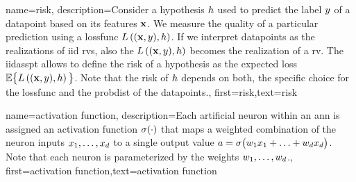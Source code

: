{name={risk},
	description={Consider a \gls{hypothesis} $h$ used to predict the \gls{label} 
		$y$ of a \gls{datapoint} based on its \gls{feature}s ${\bf x}$. We measure 
		the quality of a particular \gls{prediction} using a \gls{lossfunc} $L\left(({\bf x},y),h \right)$. 
		If we interpret \gls{datapoint}s as the \gls{realization}s of \gls{iid} \gls{rv}s, 
		also the $L\left(({\bf x},y),h \right)$ becomes the \gls{realization} 
		of a \gls{rv}. The \gls{iidasspt} allows to define the risk of a \gls{hypothesis} 
		as the expected \gls{loss} $\mathbb{E} \big\{L\left(({\bf x},y),h \right) \big\}$. 
		Note that the risk of $h$ depends on both, the specific choice for the \gls{lossfunc} and the 
		\gls{probdist} of the \gls{datapoint}s.},
	first={risk},text={risk} 
}

{name={activation function},
	description={Each artificial neuron within an \gls{ann} is 
		assigned an activation function $\sigma(\cdot)$ that maps a weighted combination of 
		the neuron inputs $x_{1},\ldots,x_{d}$ to a single output 
		value $a = \sigma\big(w_{1} x_{1}+\ldots+w_{d} x_{d} \big)$. 
		Note that each neuron is parameterized by the weights $w_{1},\ldots,w_{d}$.},
first={activation function},text={activation function} 
}





